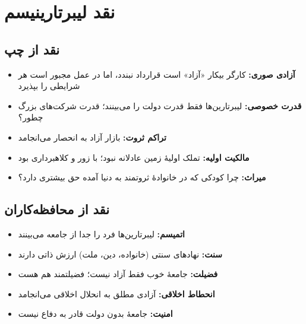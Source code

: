 \noindent{}

\section{نقد لیبرتارینیسم}

\subsection{نقد از چپ}

\begin{tcolorbox}[
    enhanced,
    colback=leftred!8,
    colframe=leftred,
    boxrule=1.5pt,
    arc=5pt,
    fonttitle=\bfseries,
    title={\rl{نقد چپ: نابرابری طبیعی‌شده}}
]
\begin{itemize}
    \item \textbf{آزادی صوری:} کارگر بیکار «آزاد» است قرارداد نبندد، اما در عمل مجبور است هر شرایطی را بپذیرد
    \item \textbf{قدرت خصوصی:} لیبرتارین‌ها فقط قدرت دولت را می‌بینند؛ قدرت شرکت‌های بزرگ چطور؟
    \item \textbf{تراکم ثروت:} بازار آزاد به انحصار می‌انجامد
    \item \textbf{مالکیت اولیه:} تملک اولیهٔ زمین عادلانه نبود؛ با زور و کلاهبرداری بود
    \item \textbf{میراث:} چرا کودکی که در خانوادهٔ ثروتمند به دنیا آمده حق بیشتری دارد؟
\end{itemize}
\end{tcolorbox}

\subsection{نقد از محافظه‌کاران}

\begin{tcolorbox}[
    enhanced,
    colback=rightblue!8,
    colframe=rightblue,
    boxrule=1.5pt,
    arc=5pt,
    fonttitle=\bfseries,
    title={\rl{نقد محافظه‌کار: انحلال جامعه}}
]
\begin{itemize}
    \item \textbf{اتمیسم:} لیبرتارین‌ها فرد را جدا از جامعه می‌بینند
    \item \textbf{سنت:} نهادهای سنتی (خانواده، دین، ملت) ارزش ذاتی دارند
    \item \textbf{فضیلت:} جامعهٔ خوب فقط آزاد نیست؛ فضیلتمند هم هست
    \item \textbf{انحطاط اخلاقی:} آزادی مطلق به انحلال اخلاقی می‌انجامد
    \item \textbf{امنیت:} جامعهٔ بدون دولت قادر به دفاع نیست
\end{itemize}
\end{tcolorbox}


